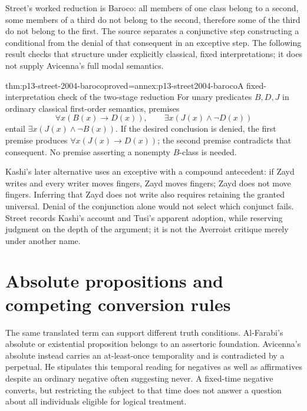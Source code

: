 Street's worked reduction is Baroco: all members
of one class belong to a second, some members of
a third do not belong to the second, therefore
some of the third do not belong to the first.
The source separates a conjunctive step constructing
a conditional from the denial of that consequent
in an exceptive step. The following result checks
that structure under explicitly classical, fixed
interpretations; it does not supply Avicenna's full
modal semantics.
\cite[pp.~546--547]{Street2004ArabicLogicHHL}

\begin{hbtheorem}{thm:p13-street-2004-baroco}{proved=annex:p13-street2004-baroco}{A fixed-interpretation check of the two-stage reduction}
For unary predicates \(B,D,J\) in ordinary classical
first-order semantics, premises
\[
 \forall x(B(x)\to D(x)),\qquad
 \exists x(J(x)\land\neg D(x))
\]
entail \(\exists x(J(x)\land\neg B(x))\).
If the desired conclusion is denied, the first
premise produces \(\forall x(J(x)\to D(x))\);
the second premise contradicts that consequent.
No premise asserting a nonempty \(B\)-class is needed.
\end{hbtheorem}

Kashi's later alternative uses an exceptive with
a compound antecedent: if Zayd writes and every
writer moves fingers, Zayd moves fingers; Zayd
does not move fingers. Inferring that Zayd does
not write also requires retaining the granted
universal. Denial of the conjunction alone would
not select which conjunct fails. Street records
Kashi's account and Tusi's apparent adoption,
while reserving judgment on the depth of the
argument; it is not the Averroist critique merely
under another name.
\cite[pp.~576--577]{Street2004ArabicLogicHHL}

\section{Absolute propositions and competing conversion rules}
\label{sec:p13-street-2004-absolute-modal}

The same translated term can support different
truth conditions. Al-Farabi's absolute or existential
proposition belongs to an assertoric foundation.
Avicenna's absolute instead carries an at-least-once
temporality and is contradicted by a perpetual.
He stipulates this temporal reading for negatives
as well as affirmatives despite an ordinary negative
often suggesting never. A fixed-time negative
converts, but restricting the subject to that time
does not answer a question about all individuals
eligible for logical treatment.
\cite[pp.~547--550]{Street2004ArabicLogicHHL}

